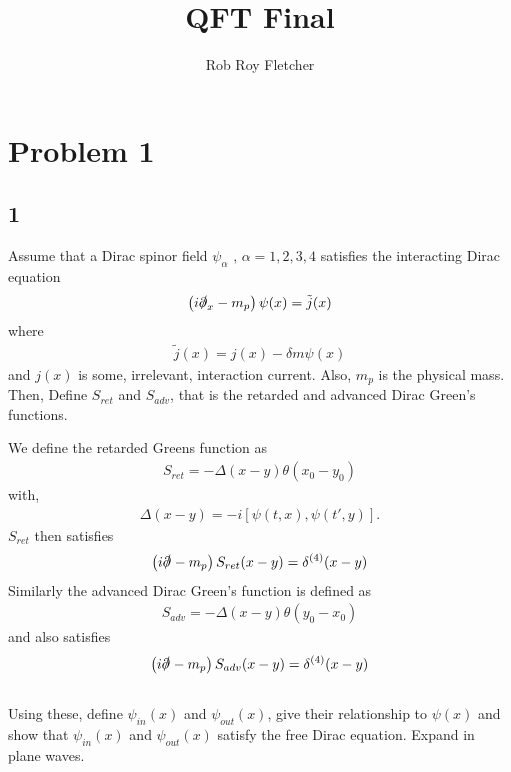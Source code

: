 \documentclass{article}
\title{QFT Final}
\author{Rob Roy Fletcher}
\numberwithin{equation}{section}
\newcommand{\direq}[2]{\left(i \slashed{\partial}_{#1} - m_p  \right) #2}
\newcommand{\px}{\psi(x)}
\newcommand{\pinx}{\psi_{in}(x)}
\newcommand{\poutx}{\psi_{out}(x)}
\newcommand{\beq}[1]{\begin{equation} \begin{aligned} #1 \end{aligned} \end{equation}}
\newcommand{\sr}{S_{ret}}
\newcommand{\sa}{S_{adv}}
\begin{document}
\maketitle

\section{Problem 1}
\subsection{1}
Assume that a Dirac spinor field $\psi_{\alpha} \text{ , } \alpha = 1,2,3,4$ satisfies the interacting Dirac equation
\beq{
    \direq{x}{\px} = \tilde{j}(x) 
}
where
\beq{
    \tilde{j}(x) = j(x) - \delta m \px
}
and $j(x)$ is some, irrelevant, interaction current. Also, $m_p$ is the physical mass. Then, Define $\sr$ and $\sa$, that is the retarded and advanced
Dirac Green's functions.

We define the retarded Greens function as
\beq{
    \sr = -\Delta(x-y) \theta(x_0 - y_0)
}
with,
\beq{
    \Delta(x-y) = -i[\psi(t,x),\psi(t',y)].
}
$\sr$ then satisfies
\beq{
    \direq{}{\sr(x-y)} = \delta^{(4)}(x-y)
}
Similarly the advanced Dirac Green's function is defined as
\beq{
    \sa = -\Delta(x-y) \theta(y_0 - x_0)
} 
and also satisfies
\beq{
    \direq{}{\sa(x-y)} = \delta^{(4)}(x-y)
}

\subsection{}
Using these, define $\pinx$ and $\poutx$, give their relationship to $\psi(x)$ and show that $\pinx$ and $\poutx$ satisfy the free Dirac equation. Expand in plane waves.
\end{document}
